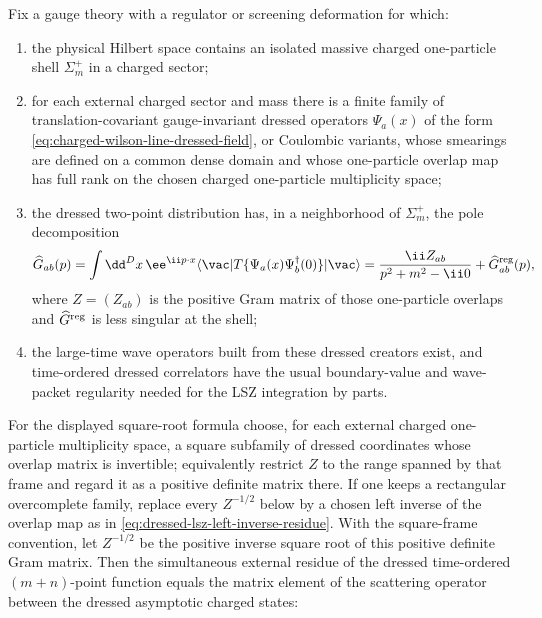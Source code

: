 \begin{theorem}
\label{thm:finite-regulator-dressed-charged-lsz}
Fix a gauge theory with a regulator or screening deformation for which:
\begin{enumerate}
\item the physical Hilbert space contains an isolated massive charged
one-particle shell \(\Sigma_m^+\) in a charged sector;
\item for each external charged sector and mass there is a finite family of
translation-covariant gauge-invariant dressed operators \(\Psi_a(x)\) of the
form \eqref{eq:charged-wilson-line-dressed-field}, or Coulombic variants,
whose smearings are defined on a common dense domain and whose one-particle
overlap map has full rank on the chosen charged one-particle multiplicity
space;
\item the dressed two-point distribution has, in a neighborhood of
\(\Sigma_m^+\), the pole decomposition
\begin{equation}
  \widehat G_{ab}(p)
  =
  \int \dd^D x\,\ee^{\ii p\cdot x}
  \langle\vac|T\{\Psi_a(x)\Psi_b^\dagger(0)\}|\vac\rangle
  =
  \frac{\ii Z_{ab}}{p^2+m^2-\ii0}
  +\widehat G^{\rm reg}_{ab}(p),
  \label{eq:dressed-two-point-pole}
\end{equation}
where \(Z=(Z_{ab})\) is the positive Gram matrix of those one-particle
overlaps and \(\widehat G^{\rm reg}\) is less singular at the shell;
\item the large-time wave operators built from these dressed creators exist,
and time-ordered dressed correlators have the usual boundary-value and
wave-packet regularity needed for the LSZ integration by parts.
\end{enumerate}
For the displayed square-root formula choose, for each external charged
one-particle multiplicity space, a square subfamily of dressed coordinates
whose overlap matrix is invertible; equivalently restrict \(Z\) to the range
spanned by that frame and regard it as a positive definite matrix there.  If
one keeps a rectangular overcomplete family, replace every \(Z^{-1/2}\) below
by a chosen left inverse of the overlap map as in
\eqref{eq:dressed-lsz-left-inverse-residue}.  With the square-frame
convention, let \(Z^{-1/2}\) be the positive inverse square root of this
positive definite Gram matrix.  Then the simultaneous external residue of the
dressed time-ordered \((m+n)\)-point function equals the matrix element of the
scattering operator between the dressed asymptotic charged states:
\begin{equation}

\end{equation}
\end{theorem}
